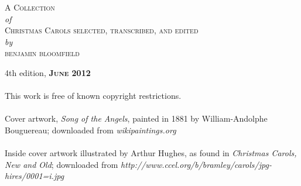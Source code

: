 \documentclass[letterpaper,12pt]{book} %
\begin{document}
\sloppy
\vspace*{0pt}
\vfill
\begin{center}
\fontsize{36}{36}\selectfont
\textsc{A Collection}\\
{\fontsize{31.5}{31.5}\selectfont
\emph{of}\\
}
\textsc{Christmas Carols}
\vfill
\fontsize{24}{24}\selectfont
\textsc{selected, transcribed, and edited}\\
{\fontsize{21}{21}\selectfont
\emph{by}\\
}
\textsc{benjamin bloomfield}
\end{center}
\vfill
\fontsize{10}{10}\selectfont
4th edition, \textbf{\textsc{June 2012}}\\
\\
This work is free of known copyright restrictions.\\
\\
Cover artwork, \emph{Song of the Angels}, painted in 1881 by William-Andolphe Bouguereau; downloaded from \emph{wikipaintings.org}\\
\\
Inside cover artwork illustrated by Arthur Hughes, as found in \emph{Christmas Carols, New and Old}; downloaded from \emph{http://www.ccel.org/b/bramley/carols/jpg-hires/0001=i.jpg}
\end{document}
